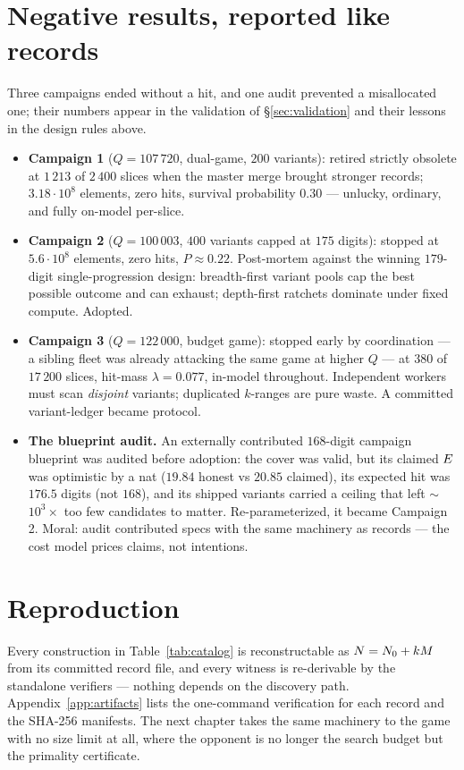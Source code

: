 \section{Negative results, reported like records}\label{sec:negatives}

Three campaigns ended without a hit, and one audit prevented a
misallocated one; their numbers appear in the validation of
\S\ref{sec:validation} and their lessons in the design rules above.

\begin{itemize}
\item \textbf{Campaign 1} ($Q=107\,720$, dual-game, $200$ variants):
retired strictly obsolete at $1\,213$ of $2\,400$ slices when the
master merge brought stronger records; $3.18\cdot10^8$ elements, zero
hits, survival probability $0.30$ --- unlucky, ordinary, and fully
on-model per-slice.
\item \textbf{Campaign 2} ($Q=100\,003$, $400$ variants capped at
$175$ digits): stopped at $5.6\cdot10^8$ elements, zero hits,
$P\approx0.22$. Post-mortem against the winning $179$-digit
single-progression design: breadth-first variant pools cap the best
possible outcome and can exhaust; depth-first ratchets dominate under
fixed compute. Adopted.
\item \textbf{Campaign 3} ($Q=122\,000$, budget game): stopped early by
coordination --- a sibling fleet was already attacking the same game at
higher $Q$ --- at $380$ of $17\,200$ slices, hit-mass $\lambda=0.077$,
in-model throughout. Independent workers must scan \emph{disjoint}
variants; duplicated $k$-ranges are pure waste. A committed
variant-ledger became protocol.
\item \textbf{The blueprint audit.} An externally contributed
$168$-digit campaign blueprint was audited before adoption: the cover
was valid, but its claimed $E$ was optimistic by a nat
($19.84$ honest vs $20.85$ claimed), its expected hit was $176.5$
digits (not $168$), and its shipped variants carried a ceiling that
left $\sim$$10^3\times$ too few candidates to matter. Re-parameterized,
it became Campaign 2. Moral: audit contributed specs with the same
machinery as records --- the cost model prices claims, not intentions.
\end{itemize}

\section{Reproduction}\label{sec:reproduction}

Every construction in Table~\ref{tab:catalog} is reconstructable as
$N=N_0+kM$ from its committed record file, and every witness is
re-derivable by the standalone verifiers --- nothing depends on the
discovery path. Appendix~\ref{app:artifacts} lists the one-command
verification for each record and the SHA-256 manifests. The next
chapter takes the same machinery to the game with no size limit at all,
where the opponent is no longer the search budget but the primality
certificate.
